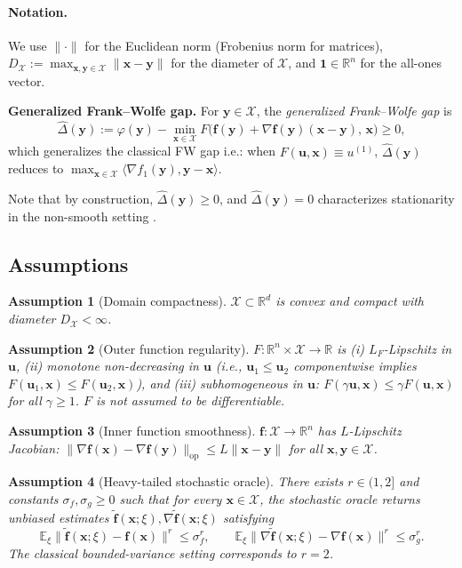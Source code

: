 \documentclass{article}
\newcommand{\cX}{\mathcal{X}}
\def\vf{{\bm{f}}}
\def\vu{{\bm{u}}}
\def\vx{{\bm{x}}}
\def\vy{{\bm{y}}}
\newcommand{\E}{\mathbb{E}}
\newcommand{\R}{\mathbb{R}}
\newtheorem{assumption}{Assumption}
\begin{document}
\paragraph{Notation.} We use $\|\cdot\|$ for the Euclidean norm (Frobenius norm for matrices), $D_{\cX} := \max_{\vx, \vy \in \cX} \|\vx - \vy\|$ for the diameter of $\cX$, and $\mathbf{1} \in \R^n$ for the all-ones vector. 

\textbf{Generalized Frank--Wolfe gap.} For $\vy \in \cX$, the \emph{generalized Frank--Wolfe gap} is
\begin{equation} \label{eq:gen_fw_gap}
\hat\Delta(\vy) := \varphi(\vy) - \min_{\vx \in \cX} F\big(\vf(\vy) + \nabla \vf(\vy)(\vx - \vy),\, \vx\big) \ge 0,
\end{equation}
which generalizes the classical FW gap i.e.: when $F(\vu, \vx) \equiv u^{(1)}$, $\hat\Delta(\vy)$ reduces to $\max_{\vx \in \cX} \langle \nabla f_1(\vy), \vy - \vx \rangle$.

Note that by construction, $\hat\Delta(\vy) \ge 0$, and $\hat\Delta(\vy) = 0$ characterizes stationarity in the non-smooth setting \citep{vladarean2023first}.

\subsection{Assumptions}

\begin{assumption}[Domain compactness] \label{assump:domain}
$\cX \subset \R^d$ is convex and compact with diameter $D_{\cX} < \infty$.
\end{assumption}

\begin{assumption}[Outer function regularity] \label{assump:outer}
$F : \R^n \times \cX \to \R$ is (i) $L_F$-Lipschitz in $\vu$, (ii) monotone non-decreasing in $\vu$ (i.e., $\vu_1 \le \vu_2$ componentwise implies $F(\vu_1, \vx) \le F(\vu_2, \vx)$), and (iii) subhomogeneous in $\vu$: $F(\gamma \vu, \vx) \le \gamma F(\vu, \vx)$ for all $\gamma \ge 1$. $F$ is \emph{not} assumed to be differentiable.
\end{assumption}

\begin{assumption}[Inner function smoothness] \label{assump:inner_smooth}
$\vf : \cX \to \R^n$ has $L$-Lipschitz Jacobian: $\|\nabla \vf(\vx) - \nabla \vf(\vy)\|_{\mathrm{op}} \le L \|\vx - \vy\|$ for all $\vx, \vy \in \cX$.
\end{assumption}

\begin{assumption}[Heavy-tailed stochastic oracle] \label{assump:noise}
There exists $r \in (1, 2]$ and constants $\sigma_f, \sigma_g \ge 0$ such that for every $\vx \in \cX$, the stochastic oracle returns unbiased estimates $\tilde\vf(\vx; \xi), \nabla\tilde\vf(\vx; \xi)$ satisfying
\[
\E_\xi\|\tilde\vf(\vx; \xi) - \vf(\vx)\|^r \le \sigma_f^r,
\qquad
\E_\xi\|\nabla \tilde\vf(\vx; \xi) - \nabla \vf(\vx)\|^r \le \sigma_g^r.
\]
The classical bounded-variance setting corresponds to $r = 2$.
\end{assumption}
\end{document}
